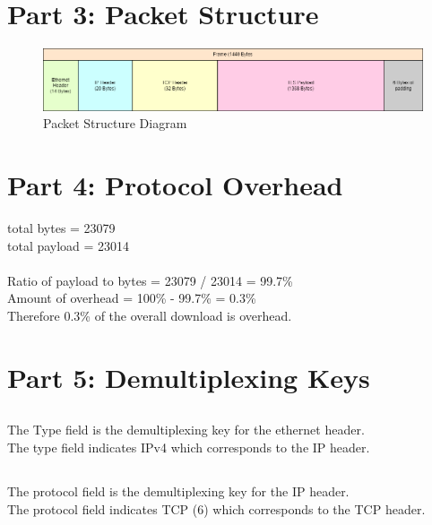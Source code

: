 \documentclass{article}
\begin{document}
    \section*{Part 3: Packet Structure}
    \begin{figure}[htbp]
        \centering
        \includegraphics[width=\textwidth]{images/packet_structure.drawio.png}
        \caption{Packet Structure Diagram}
    \end{figure}
    \section*{Part 4: Protocol Overhead}

    total bytes = 23079\\
    total payload = 23014\\\\

    Ratio of payload to bytes = 23079 / 23014 = 99.7\%\\
    Amount of overhead = 100\% - 99.7\% = 0.3\%\\

    Therefore 0.3\% of the overall download is overhead.\\

    \section*{Part 5: Demultiplexing Keys}
    \subsection{}
    The Type field is the demultiplexing key for the ethernet header.\\

    The type field indicates IPv4 which corresponds to the IP header.\\

    \subsection{}
    The protocol field is the demultiplexing key for the IP header.\\

    The protocol field indicates TCP (6) which corresponds to the TCP header.\\
\end{document}
